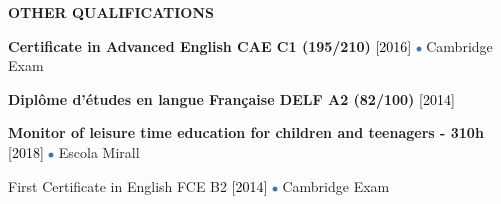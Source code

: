 \documentclass[../main.tex]{subfiles}
\begin{document}
    \vspace*{0.5cm}
    \textbf{\textcolor{myCV2}{OTHER QUALIFICATIONS\underline{\hspace{4.5cm}}}}
        \vspace*{0.3cm}
        
        \textbf{Certificate in Advanced English CAE C1 (195/210)}
        \textcolor{black}{[2016]}
        \includegraphics[width=0.15cm]{assets/full.png} 
        Cambridge Exam
        
        \vspace*{0.25cm}
        \textbf{Diplôme d'études en langue Française DELF A2 (82/100)} 
        \textcolor{black}{[2014]}
        
        \vspace*{0.25cm}
        \textbf{Monitor of leisure time education for children and teenagers - 310h}
        \textcolor{black}{[2018]}
        \includegraphics[width=0.15cm]{assets/full.png} 
        Escola Mirall
        
        \vspace*{0.25cm}
        First Certificate in English FCE B2
        \textcolor{black}{[2014]}
        \includegraphics[width=0.15cm]{assets/full.png} 
        Cambridge Exam 
        

\end{document}
